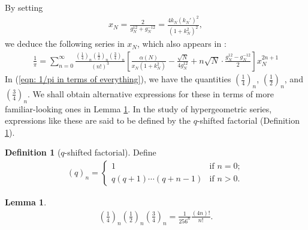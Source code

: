 \documentclass[11pt]{amsart}
\theoremstyle{definition}
\numberwithin{theorem}{section}
\newtheorem{definition}[theorem]{Definition}
\newtheorem{lemma}[theorem]{Lemma}
\begin{document}
By setting \begin{align}\label{eqn: x_N formula}
    x_N=\frac{2}{g_N^{12}+g_{N}^{-12}}=\frac{4k_N\left(k_N'\right)^2}{\left(1+k_N^2\right)^2},
\end{align}
we deduce the following series in $x_N$, which also appears in \cite{pi and the agm}:
\begin{align}\label{eqn: 1/pi in terms of everything}
    \frac{1}{\pi}=\sum_{n=0}^{\infty}\frac{\left(\frac{1}{4}\right)_n\left(\frac{1}{2}\right)_n\left(\frac{3}{4}\right)_n}{\left(n!\right)^3}\left[\frac{\alpha\left(N\right)}{x_N\left(1+k_N^2\right)}-\frac{\sqrt{N}}{4g_N^{12}}+n\sqrt{N}\cdot \frac{g_N^{12}-g_N^{-12}}{2}\right]x_{N}^{2n+1}
\end{align}
In (\ref{eqn: 1/pi in terms of everything}), we have the quantities $\left(\frac{1}{4}\right)_n$, $\left(\frac{1}{2}\right)_n$, and $\left(\frac{3}{4}\right)_n$. We shall obtain alternative expressions for these in terms of more familiar-looking ones in Lemma \ref{lemma hypergeometric}. In the study of hypergeometric series, expressions like these are said to be defined by the $q$-shifted factorial (Definition \ref{q shifted factorial}).
\begin{definition}[$q$-shifted factorial]\label{q shifted factorial}
Define \begin{align*}
    \left(q\right)_n=\begin{cases}
        1 & \text{if }n=0;\\
        q\left(q+1\right)\cdots\left(q+n-1\right) & \text{if }n>0.
    \end{cases}
\end{align*}
\end{definition}
\begin{lemma}\label{lemma hypergeometric}
\begin{align*}
    \left(\frac{1}{4}\right)_n\left(\frac{1}{2}\right)_n\left(\frac{3}{4}\right)_n=\frac{1}{256^n} \frac{\left(4n\right)!}{n!}.
\end{align*}
\end{lemma}
\end{document}
